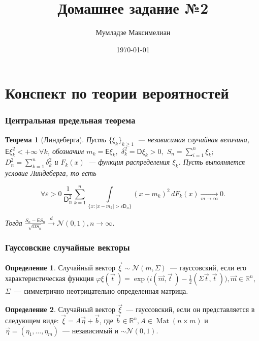 \documentclass[11pt]{article}
\author{Мумладзе Максимелиан}
\title{Домашнее задание №2}
\date{\today}
\DeclareMathOperator{\mat}{Mat}
\newtheorem{thm}{Теорема}[section]
\theoremstyle{definition}\newtheorem{defi}{Определение}
\begin{document}
\maketitle

\part{Конспект по теории вероятностей}

\section{Центральная предельная теорема}

\begin{thm}[Линдеберга]

Пусть $\{\xi_k\}_{k \geq 1}$~--- независимая случайная величина, $\mathsf{E} \xi_k^2 < +\infty ~ \forall k$, обозначим $m_k = \mathsf{E} \xi_k,$ $\delta_k^2 = \mathsf{D} \xi_k > 0,$ $S_n = \sum\limits_{i = 1}^n \xi_k;$ $D_n^2 = \sum\limits_{k = 1}^n \delta_k^2$ и $F_k(x)$~--- функция распределения $\xi_k$. Пусть выполняется условие Линдеберга, то есть

$$
\forall \varepsilon > 0 ~ \frac{1}{\mathsf{D}_n^2} \sum\limits_{k = 1}^n \int\limits_{\big\{x: |x - m_k| > \varepsilon \mathsf{D}_n\big\}} (x - m_k)^2\,dF_k(x) \xrightarrow[m \rightarrow \infty]{} 0.
$$

Тогда $\frac{S_n - \mathsf{E} S_n}{\sqrt{\mathsf{D} S_n}} \xrightarrow{d} \mathcal{N}(0, 1), n \rightarrow \infty$.

\end{thm}


\section{Гауссовские случайные векторы}

\begin{defi}

Случайный вектор $\vec \xi \sim \mathcal{N}(m, \Sigma)$~--- гауссовский, если его характеристическая функция $\varphi \xi(\vec t\,) = \exp \big(i(\vec m, \vec t\,) - \frac{1}{2} (\Sigma \vec t, \vec t\,) \big), \vec m \in \mathbb{R}^n$, $\Sigma$~--- симметрично неотрицательно определенная матрица.

\end{defi}

\begin{defi}

Случайный вектор $\vec \xi$~--- гауссовский, если он представляется в следующем виде: $\vec \xi = A \vec \eta + \vec b$, где $\vec b \in \mathbb{R}^n, A \in \mat(n \times m)$ и $\vec \eta = (\eta_1, \dots, \eta_m)$~--- независимый и $\sim \mathcal{N}(0, 1)$.

\end{defi}
\end{document}
